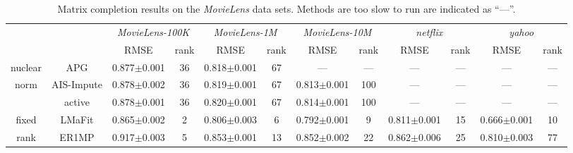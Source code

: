 \documentclass[10pt,journal,compsoc]{IEEEtran}
\begin{document}
\begin{table*}[ht]
\centering
\caption{Matrix completion results on the \textit{MovieLens} data sets.
	Methods are too slow to run are indicated as ``---''.
}
\vspace{-10px}

\label{tab:movielen}
\begin{tabular}{cc|cc|cc|cc|cc|cc}
	\hline
	         &                     & \multicolumn{2}{c|}{\textit{MovieLens-100K}} & \multicolumn{2}{c|}{\textit{MovieLens-1M}} & \multicolumn{2}{c|}{\textit{MovieLens-10M}} & \multicolumn{2}{c}{\textit{netflix}} & \multicolumn{2}{c}{\textit{yahoo}} \\
	         &                     &           RMSE           &       rank        &           RMSE           &      rank       &           RMSE           &       rank       &           RMSE           &   rank    &           RMSE           &  rank   \\ \hline
	nuclear  &    \textsf{APG}     &     0.877$\pm$0.001      &        36         &     0.818$\pm$0.001      &       67        &           ---            &       ---        &           ---            &    ---    &           ---            &   ---   \\ \cline{2-12}
	  norm   & \textsf{AIS-Impute} &     0.878$\pm$0.002      &        36         &     0.819$\pm$0.001      &       67        &     0.813$\pm$0.001      &       100        &           ---            &    ---    &           ---            &   ---   \\ \cline{2-12}
	         &   \textsf{active}   &     0.878$\pm$0.001      &        36         &     0.820$\pm$0.001      &       67        &     0.814$\pm$0.001      &       100        &           ---            &    ---    &           ---            &   ---   \\ \hline\hline
	 fixed   &   \textsf{LMaFit}   &     0.865$\pm$0.002      &         2         &     0.806$\pm$0.003      &        6        &     0.792$\pm$0.001      &        9         &     0.811$\pm$0.001      &    15     &     0.666$\pm$0.001      &   10    \\ \cline{2-12}
	  rank   &   \textsf{ER1MP}    &     0.917$\pm$0.003      &         5         &     0.853$\pm$0.001      &       13        &     0.852$\pm$0.002      &        22        &     0.862$\pm$0.006      &    25     &     0.810$\pm$0.003      &   77    \\ \hline\hline

\end{tabular}
\end{table*}
\end{document}
